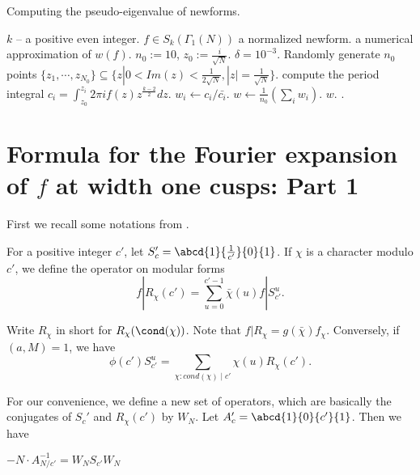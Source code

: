 \documentclass [11pt, proquest] {uwthesis}[2015/03/03]
\begin{document}
\begin{algorithm}[H]
\caption{Computing the pseudo-eigenvalue of newforms.}
\label{alg: pseudo-eigenvalue}
\begin{algorithmic}[1]
    \Require $k$ -- a positive even integer. $f \in S_k(\Gamma_1(N))$ a normalized newform.    
    \Ensure a numerical approximation of $w(f)$.
    \State $n_0 := 10$, $z_0 := \frac{i}{\sqrt{N}}$. $\delta = 10^{-3}$. 
    \State Randomly generate $n_0$ points $\{z_1, \cdots, z_{N_0}\} \subseteq \{z | 0 < Im(z) < \frac{1}{2\sqrt{N}}, |z| = \frac{1}{\sqrt{N}} \}$.
    	\State compute the period integral $c_i =  \int_{z_0}^{z_i} 2\pi i f(z) z^{\frac{k-2}{2}} dz$. 
	\State $w_i \gets c_i/\bar{c_i}$. 
    \EndFor
     \State $w \gets \frac{1}{n_0}(\sum_i w_i)$. 
     \State \Return $w$.
    \Else
    	\State {}. 
    \EndIf
\end{algorithmic}
\end{algorithm}



\section{Formula for the Fourier expansion of $f$ at width one cusps: Part 1}

First we recall some notations from \cite{atkin1978twists}.
\begin{Definition}
For a positive integer $c'$, let $S_c' = \abcd{1}{\frac{1}{c'}}{0}{1}$. If $\chi$ is a character modulo $c'$, we define the 
operator on modular forms 
\begin{equation*}
\label{formula: RS}
	f | R_\chi(c') = \sum_{u =0}^{c'-1} \bar{\chi}(u) f | S_{c'}^u.
\end{equation*}
\end{Definition}
Write $R_\chi$ in short for $R_\chi(\cond(\chi))$. Note that $f|R_\chi = g(\bar{\chi})f_\chi$.
Conversely, if $(a,M) = 1$, we have 
\begin{equation}
\label{formula: SR}
	\phi(c')S_{c'}^u = \sum_{\chi: cond(\chi) \mid c'} \chi(u) R_\chi(c').
\end{equation}

For our convenience, we define a new set of operators, which are basically the conjugates of $S_c'$ and $R_\chi(c')$ by $W_N$. Let $A_c' = \abcd{1}{0}{c'}{1}$.  Then we have 
\begin{Fact}
$-N \cdot A_{N/c'}^{-1} = W_N S_{c'} W_N$
\end{Fact}
\end{document}
